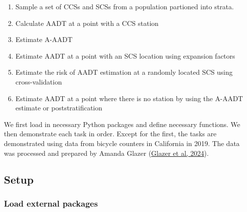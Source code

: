 \documentclass[11pt]{article}
\providecommand{\tightlist}{%
      \setlength{\itemsep}{0pt}\setlength{\parskip}{0pt}}
\begin{document}
\begin{enumerate}
\def\labelenumi{\arabic{enumi}.}
\tightlist
\item
  Sample a set of CCSs and SCSs from a population partioned into strata.
\item
  Calculate AADT at a point with a CCS station
\item
  Estimate A-AADT
\item
  Estimate AADT at a point with an SCS location using expansion factors
\item
  Estimate the risk of AADT estimation at a randomly located SCS using
  cross-validation
\item
  Estimate AADT at a point where there is no station by using the A-AADT
  estimate or poststratification
\end{enumerate}

We first load in necessary Python packages and define necessary
functions. We then demonstrate each task in order. Except for the first,
the tasks are demonstrated using data from bicycle counters in
California in 2019. The data was processed and prepared by Amanda Glazer
(\href{https://www.researchgate.net/publication/377362665_DATA_CHECKS_FOR_BICYCLE_AND_PEDESTRIAN_COUNTS}{Glazer
et al, 2024}).

    \subsection{Setup}\label{setup}

    \subsubsection{Load external packages}\label{load-external-packages}
\end{document}

